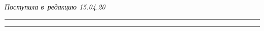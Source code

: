 \vspace*{-6pt}





\hfill{\small\textit{Поступила в~редакцию 15.04.20}}





\vspace*{8pt}




















\hrule





\vspace*{2pt}





\hrule










\def\tit{APPROXIMATION OF PARTICLE SIZE DISTRIBUTIONS\\ OF~LUNAR REGOLITH 


BASED ON~THE~RESAMPLING}








\def\titkol{Approximation of particle size distributions of lunar 


regolith based on the


resampling}





\def\aut{A.\,K.~Gorshenin$^{1,2}$ and~V.\,Yu.~Korolev$^{1,2}$}





\def\autkol{A.\,K.~Gorshenin and~V.\,Yu.~Korolev}





